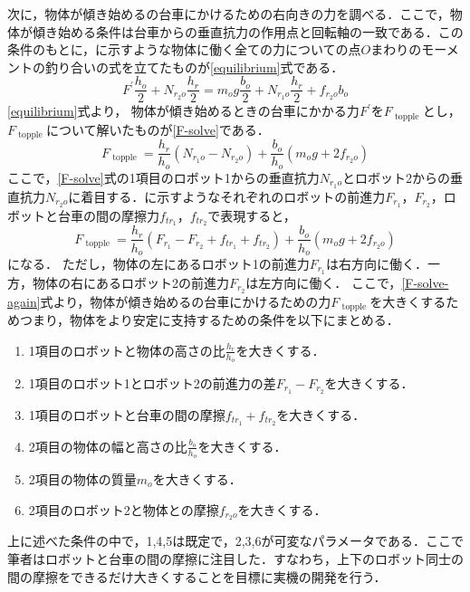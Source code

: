 次に，物体が傾き始めるの台車にかけるための右向きの力を調べる．ここで，物体が傾き始める条件は台車からの垂直抗力の作用点と回転軸の一致である．この条件のもとに，に示すような物体に働く全ての力についての点$O$まわりのモーメントの釣り合いの式を立てたものが\eqref{equilibrium}式である．
\begin{equation}
F^{\prime} \frac{h_{o}}{2}+N_{r_{2} o} \frac{h_{r}}{2}=m_{o} g \frac{b_{o}}{2}+N_{r_{1} o} \frac{h_{r}}{2}+f_{r_{2} o} b_{o}
\label{equilibrium}
\end{equation}
\eqref{equilibrium}式より，
物体が傾き始めるときの台車にかかる力$F^{\prime}$を$F_{\text { topple }}$とし，$F_{\text { topple }}$について解いたものが\eqref{F-solve}である．
\begin{equation}
    F_{\text { topple }}=\frac{h_{r}}{h_{o}}\left(N_{r_{1} o}-N_{r_{2} o}\right)+\frac{b_{o}}{h_{o}}\left(m_{o} g+2 f_{r_2 o}\right)
    \label{F-solve}
\end{equation}
ここで，\eqref{F-solve}式の1項目のロボット1からの垂直抗力$N_{r_1 o}$とロボット2からの垂直抗力$N_{r_2 o}$に着目する．に示すようなそれぞれのロボットの前進力$F_{r_1}$，$F_{r_2}$，ロボットと台車の間の摩擦力$f_{tr_1}$，$f_{tr_2}$で表現すると，
\begin{equation}
    F_{\text { topple }}=\frac{h_{r}}{h_{o}}\left(F_{r_{1}}-F_{r_{2}}+f_{t{r_1}}+f_{t{r_2}}\right)+\frac{b_{o}}{h_{o}}\left(m_{o} g+2 f_{r_2 o}\right)
    \label{F-solve-again}
\end{equation}
になる．
ただし，物体の左にあるロボット1の前進力$F_{r_{1}}$は右方向に働く．一方，物体の右にあるロボット2の前進力$F_{r_{2}}$は左方向に働く．
ここで，\eqref{F-solve-again}式より，物体が傾き始めるの台車にかけるための力$F_{\text { topple }}$を大きくするためつまり，物体をより安定に支持するための条件を以下にまとめる．
\begin{enumerate}
    \item 1項目のロボットと物体の高さの比$\frac{h_{r}}{h_{o}}$を大きくする．
    \item 1項目のロボット1とロボット2の前進力の差$F_{r_{1}}-F_{r_{2}}$を大きくする．
    \item 1項目のロボットと台車の間の摩擦$f_{t{r_1}}+f_{t{r_2}}$を大きくする．
    \item 2項目の物体の幅と高さの比$\frac{b_{o}}{h_{o}}$を大きくする．
    \item 2項目の物体の質量$m_{o}$を大きくする．
    \item 2項目のロボット2と物体との摩擦$f_{r_2 o}$を大きくする．  
\end{enumerate}
上に述べた条件の中で，1,4,5は既定で，2,3,6が可変なパラメータである．ここで筆者はロボットと台車の間の摩擦に注目した．すなわち，上下のロボット同士の間の摩擦をできるだけ大きくすることを目標に実機の開発を行う．


